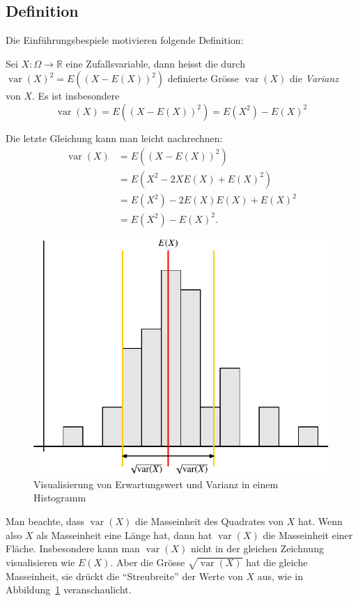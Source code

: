 \subsection{Definition}
Die Einführungsbespiele motivieren folgende Definition:
\begin{definition}
Sei $X\colon\Omega\to\mathbb{R}$ eine Zufallsvariable, dann
heisst die durch $\operatorname{var}(X)^2=E((X-E(X))^2)$ definierte Grösse $\operatorname{var}(X)$ die
{\em Varianz} von $X$.
Es ist insbesondere
\[
\operatorname{var}(X)=E((X-E(X))^2)=E(X^2)-E(X)^2
\]
\end{definition}
Die letzte Gleichung kann man leicht nachrechnen:
\begin{align*}
\operatorname{var}(X)&=E((X-E(X))^2)\\
&=E(X^2-2XE(X)+E(X)^2)\\
&=E(X^2)-2E(X)E(X)+E(X)^2\\
&=E(X^2)-E(X)^2.
\end{align*}
\begin{figure}
\begin{center}
\includegraphics{images/erwartung-1}
\end{center}
\caption{Visualisierung von Erwartungswert und Varianz in einem Histogramm
\label{histogram}}
\end{figure}%

Man beachte, dass $\operatorname{var}(X)$ die Masseinheit des Quadrates
von $X$ hat.
Wenn also $X$ als Masseinheit eine Länge hat,
dann hat $\operatorname{var}(X)$ die Masseinheit einer Fläche.
Insbesondere kann man $\operatorname{var}(X)$ nicht in der gleichen
Zeichnung visualisieren wie $E(X)$.
Aber die Grösse $\sqrt{\operatorname{var}(X)}$ hat die gleiche Masseinheit, sie
drückt die ``Streubreite'' der Werte von $X$ aus,
wie in Abbildung~\ref{histogram} veranschaulicht.

